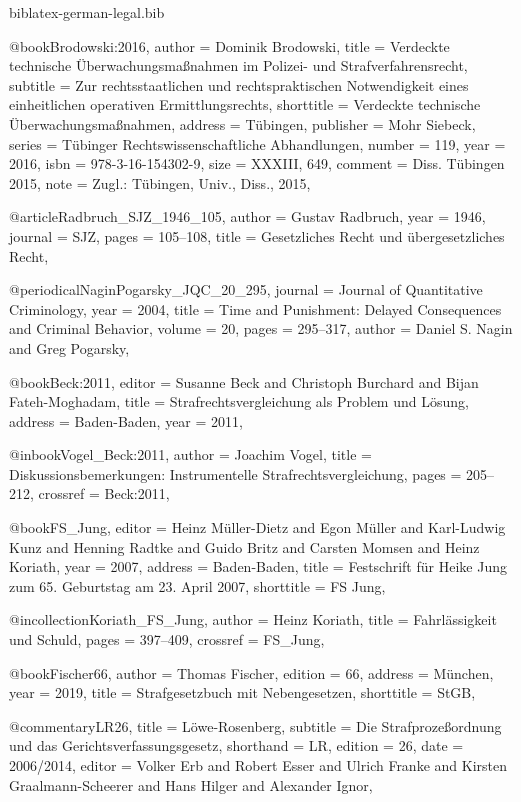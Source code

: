 \documentclass{ltxdockit}[2010/09/26]
\begin{document}
\begin{filecontents*}{biblatex-german-legal.bib}

@book{Brodowski:2016,
author = {Dominik Brodowski},
title = {Verdeckte technische Überwachungsmaßnahmen im Polizei- und Strafverfahrensrecht},
subtitle = {Zur rechtsstaatlichen und rechtspraktischen Notwendigkeit eines einheitlichen operativen Ermittlungsrechts},
shorttitle = {Verdeckte technische Überwachungsmaßnahmen},
address = {Tübingen},
publisher = {Mohr Siebeck},
series = {Tübinger Rechtswissenschaftliche Abhandlungen},
number = {119},
year = {2016},
isbn = {978-3-16-154302-9},
size = {XXXIII, 649},
comment = {Diss. Tübingen 2015},
note = {Zugl.: Tübingen, Univ., Diss., 2015},
}

@article{Radbruch_SJZ_1946_105,
author = {Gustav Radbruch},
year = {1946},
journal = {SJZ},
pages = {105--108},
title = {Gesetzliches Recht und übergesetzliches Recht},
}

@periodical{NaginPogarsky_JQC_20_295,
journal = {Journal of Quantitative Criminology},
year = {2004},
title = {Time and Punishment: Delayed Consequences and Criminal Behavior},
volume = {20},
pages = {295--317},
author = {Daniel S. Nagin and Greg Pogarsky},
}

@book{Beck:2011,
editor = {Susanne Beck and Christoph Burchard and Bijan Fateh-Moghadam},
title = {Strafrechtsvergleichung als Problem und Lösung},
address = {Baden-Baden},
year = {2011},
}

@inbook{Vogel_Beck:2011,
author = {Joachim Vogel},
title = {Diskussionsbemerkungen: Instrumentelle Strafrechtsvergleichung},
pages = {205--212},
crossref = {Beck:2011},
}

@book{FS_Jung,
editor = {Heinz Müller-Dietz and Egon Müller and Karl-Ludwig Kunz and Henning Radtke and Guido Britz and Carsten Momsen and Heinz Koriath},
year = {2007},
address = {Baden-Baden},
title = {Festschrift für Heike Jung zum 65. Geburtstag am 23. April 2007},
shorttitle = {FS Jung},
}

@incollection{Koriath_FS_Jung,
author = {Heinz Koriath},
title = {Fahrlässigkeit und Schuld},
pages = {397--409},
crossref = {FS_Jung},
}

@book{Fischer66,
author = {Thomas Fischer},
edition = {66},
address = {München},
year = {2019},
title = {Strafgesetzbuch mit Nebengesetzen},
shorttitle = {StGB},
}

@commentary{LR26,
title = {Löwe-Rosenberg},
subtitle = {Die Strafprozeßordnung und das Gerichtsverfassungsgesetz},
shorthand = {LR},
edition = {26},
date = {2006/2014},
editor = {Volker Erb and Robert Esser and Ulrich Franke and Kirsten Graalmann-Scheerer and Hans Hilger and Alexander Ignor},
}


\end{filecontents*}
\end{document}
